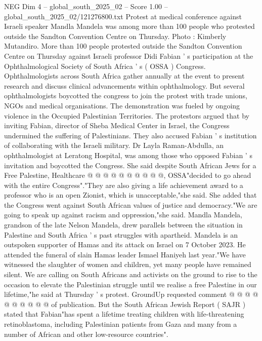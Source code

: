 \begin{textsample}{NEG Dim 4 – global\_south\_2025\_02 – Score 1.00 – global\_south\_2025\_02/121276800.txt}  \label{ex:f4_neg_439}
Protest at medical conference against Israeli speaker Mandla Mandela was among more than 100 people who protested outside the Sandton Convention Centre on Thursday.
Photo : Kimberly Mutandiro.
More than 100 people protested outside the Sandton Convention Centre on Thursday against Israeli professor Didi Fabian ' s participation at the Ophthalmological Society of South Africa ' s ( OSSA ) Congress.
Ophthalmologists across South Africa gather annually at the event to present research and discuss clinical advancements within ophthalmology.
But several ophthalmologists boycotted the congress to join the protest with trade unions, NGOs and medical organisations.
The demonstration was fueled by ongoing violence in the Occupied Palestinian Territories.
The protestors argued that by inviting Fabian, director of Sheba Medical Center in Israel, the Congress undermined the suffering of Palestinians.
They also accused Fabian ' s institution of collaborating with the Israeli military.
Dr Layla Raman-Abdulla, an ophthalmologist at Leratong Hospital, was among those who opposed Fabian ' s invitation and boycotted the Congress.
She said despite South African Jews for a Free Palestine, Healthcare @ @ @ @ @ @ @ @ @ @, OSSA"decided to go ahead with the entire Congress"."They are also giving a life achievement award to a professor who is an open Zionist, which is unacceptable,"she said.
She added that the Congress went against South African values of justice and democracy."We are going to speak up against racism and oppression,"she said.
Mandla Mandela, grandson of the late Nelson Mandela, drew parallels between the situation in Palestine and South Africa ' s past struggles with apartheid.
Mandela is an outspoken supporter of Hamas and its attack on Israel on 7 October 2023.
He attended the funeral of slain Hamas leader Ismael Haniyeh last year."We have witnessed the slaughter of women and children, yet many people have remained silent.
We are calling on South Africans and activists on the ground to rise to the occasion to elevate the Palestinian struggle until we realise a free Palestine in our lifetime,"he said at Thursday ' s protest.
GroundUp requested comment @ @ @ @ @ @ @ @ @ @ of publication.
But the South African Jewish Report ( SAJR ) stated that Fabian"has spent a lifetime treating children with life-threatening retinoblastoma, including Palestinian patients from Gaza and many from a number of African and other low-resource countries".

\end{textsample}
